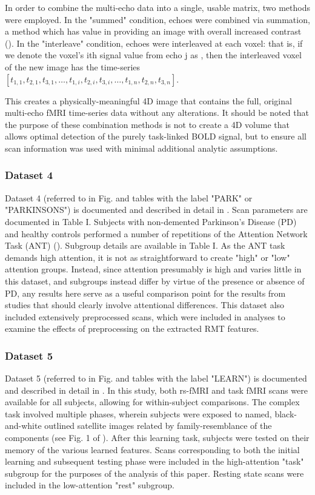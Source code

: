 In order to combine the multi-echo data into a single, usable matrix, two methods were employed. In
the "summed" condition, echoes were combined via summation, a method which has value in providing an
image with overall increased contrast (\cite{kunduMultiechoFMRIReview2017}). In the "interleave"
condition, echoes were interleaved at each voxel: that is, if we denote the voxel's ith signal value
from echo j as , then the interleaved voxel of the new image has the time-series \([t_{1,1},
t_{2,1}, t_{3,1}, \dots, t_{1,i}, t_{2,i}, t_{3,i}, \dots, t_{1,n}, t_{2,n}, t_{3,n}]\).

This creates a physically-meaningful 4D image that contains the full, original multi-echo fMRI
time-series data without any alterations. It should be noted that the purpose of these combination
methods is not to create a 4D volume that allows optimal detection of the purely task-linked BOLD
signal, but to ensure all scan information was used with minimal additional analytic assumptions.

\subsubsection{Dataset 4}
Dataset 4 (referred to in Fig. and tables with the label "PARK" or "PARKINSONS") is documented and
described in detail in \cite{madhyasthaDynamicConnectivityRest2015}. Scan parameters are documented
in Table I. Subjects with non-demented Parkinson’s Disease (PD) and healthy controls performed a
number of repetitions of the Attention Network Task (ANT)
(\cite{fanActivationAttentionalNetworks2005}). Subgroup details are available in Table I. As the ANT
task demands high attention, it is not as straightforward to create "high" or "low" attention
groups. Instead, since attention presumably is high and varies little in this dataset, and subgroups
instead differ by virtue of the presence or absence of PD, any results here serve as a useful
comparison point for the results from studies that should clearly involve attentional differences.
This dataset also included extensively preprocessed scans, which were included in analyses to
examine the effects of preprocessing on the extracted RMT features.

\subsubsection{Dataset 5}
Dataset 5 (referred to in Fig. and tables with the label "LEARN") is documented and described in
detail in \cite{schapiroHumanHippocampalReplay2018}. In this study, both rs-fMRI and task fMRI scans
were available for all subjects, allowing for within-subject comparisons. The complex task involved
multiple phases, wherein subjects were exposed to named, black-and-white outlined satellite images
related by family-resemblance of the components (see Fig. 1 of
\cite{schapiroHumanHippocampalReplay2018}). After this learning task, subjects were tested on their
memory of the various learned features. Scans corresponding to both the initial learning and
subsequent testing phase were included in the high-attention "task" subgroup for the purposes of the
analysis of this paper. Resting state scans were included in the low-attention "rest" subgroup.

